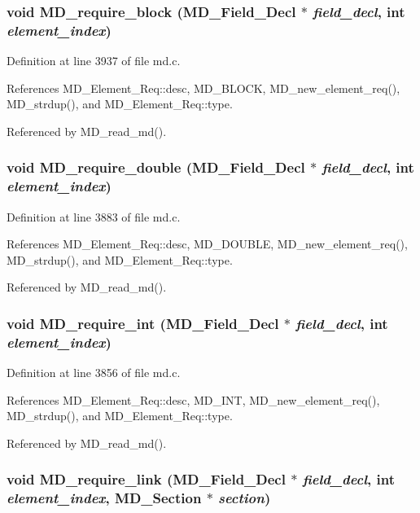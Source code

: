 \subsubsection{\setlength{\rightskip}{0pt plus 5cm}void MD\_\-require\_\-block (\bf{MD\_\-Field\_\-Decl} $\ast$ {\em field\_\-decl}, int {\em element\_\-index})}\label{md_8h_0d7c1b6c82b809db593340365c706367}




Definition at line 3937 of file md.c.

References MD\_\-Element\_\-Req::desc, MD\_\-BLOCK, MD\_\-new\_\-element\_\-req(), MD\_\-strdup(), and MD\_\-Element\_\-Req::type.

Referenced by MD\_\-read\_\-md().
\subsubsection{\setlength{\rightskip}{0pt plus 5cm}void MD\_\-require\_\-double (\bf{MD\_\-Field\_\-Decl} $\ast$ {\em field\_\-decl}, int {\em element\_\-index})}\label{md_8h_8138319398084eee4e558c2e19824d9f}




Definition at line 3883 of file md.c.

References MD\_\-Element\_\-Req::desc, MD\_\-DOUBLE, MD\_\-new\_\-element\_\-req(), MD\_\-strdup(), and MD\_\-Element\_\-Req::type.

Referenced by MD\_\-read\_\-md().
\subsubsection{\setlength{\rightskip}{0pt plus 5cm}void MD\_\-require\_\-int (\bf{MD\_\-Field\_\-Decl} $\ast$ {\em field\_\-decl}, int {\em element\_\-index})}\label{md_8h_c62eab6c660919a2250857aaffaddebb}




Definition at line 3856 of file md.c.

References MD\_\-Element\_\-Req::desc, MD\_\-INT, MD\_\-new\_\-element\_\-req(), MD\_\-strdup(), and MD\_\-Element\_\-Req::type.

Referenced by MD\_\-read\_\-md().
\subsubsection{\setlength{\rightskip}{0pt plus 5cm}void MD\_\-require\_\-link (\bf{MD\_\-Field\_\-Decl} $\ast$ {\em field\_\-decl}, int {\em element\_\-index}, \bf{MD\_\-Section} $\ast$ {\em section})}\label{md_8h_cf268a6735d036c0166261196439a452}




